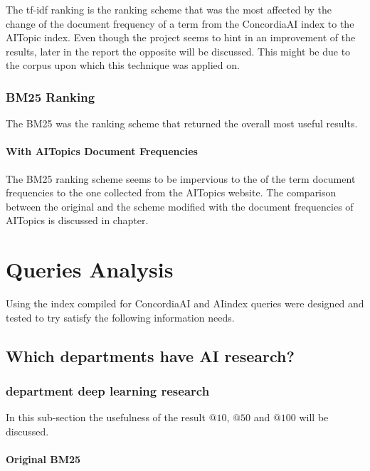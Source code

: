 The tf-idf ranking is the ranking scheme that was the most affected by the change of the document frequency of a term from the ConcordiaAI index to the AITopic index. Even though the project seems to hint in an improvement of the results, later in the report the opposite will be discussed. This might be due to the corpus upon which this technique was applied on.

\subsection{BM25 Ranking} \label{BM25}

\par The BM25 was the ranking scheme that returned the overall most useful results. 

\subsubsection{With AITopics Document Frequencies}

\par The BM25 ranking scheme seems to be impervious to the of the term document frequencies to the one collected from the AITopics website. The comparison between the original and the scheme modified with the document frequencies of AITopics is discussed in chapter.

\chapter{Queries Analysis}

\par Using the index compiled for ConcordiaAI and AIindex queries were designed and tested to try satisfy the following information needs.

\section{Which departments have AI research?}
\subsection{department deep learning research}\label{query-1}

\par In this sub-section the usefulness of the result $@10$, $@50$ and $@100$ will be discussed.
\subsubsection{Original BM25}\label{query-1-bm-25}

